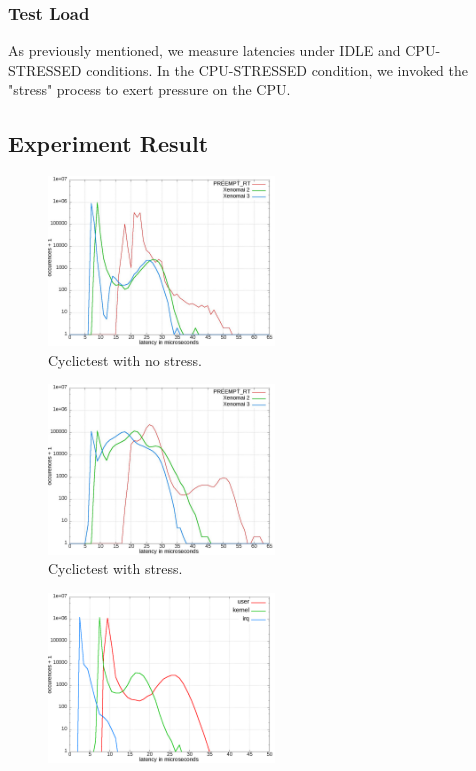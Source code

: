 \documentclass[10pt,a4paper]{article}
\begin{document}
\begin{multicols}{2}
\subsubsection{Test Load}
As previously mentioned, we measure latencies under IDLE and CPU-STRESSED conditions. In the CPU-STRESSED condition, we invoked the "stress" process to exert pressure on the CPU.

\subsection{Experiment Result}
\begin{figure}[H]
\begin{center}
\includegraphics[width=6cm]{img/cyclictest_idle.jpg}
\caption{Cyclictest with no stress.}
\label{cyclictest-idle}
\end{center}
\end{figure}
\begin{figure}[H]
\begin{center}
\includegraphics[width=6cm]{img/cyclictest_stress.jpg}
\caption{Cyclictest with stress.}
\label{cyclictest-stress}
\end{center}
\end{figure}
\begin{figure}[H]
\begin{center}
\includegraphics[width=6cm]{img/x2-idle.png}

\end{center}
\end{figure}
\end{multicols}
\end{document}
